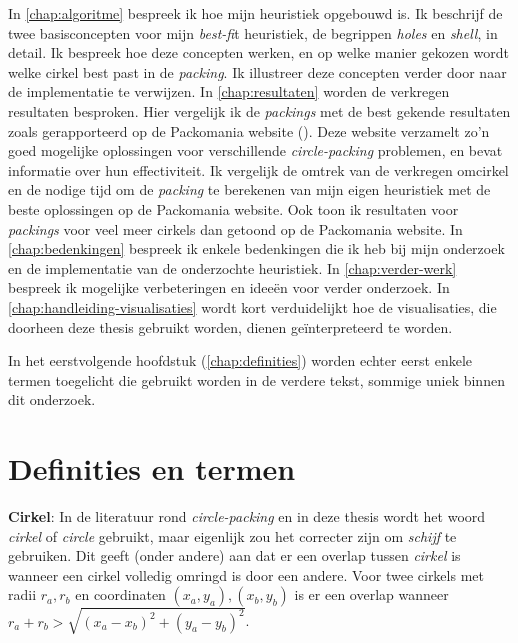 \documentclass[12pt,a4paper,oneside]{book}
\begin{document}
In \autoref{chap:algoritme} bespreek ik hoe mijn heuristiek opgebouwd is.
Ik beschrijf de twee basisconcepten voor mijn \textit{best-fi}t heuristiek, de begrippen \textit{holes} en \textit{shell}, in detail.
Ik bespreek hoe deze concepten werken, en op welke manier gekozen wordt welke cirkel best past in de \textit{packing}.
Ik illustreer deze concepten verder door naar de implementatie te verwijzen.
In \autoref{chap:resultaten} worden de verkregen resultaten besproken.
Hier vergelijk ik de \textit{packings} met de best gekende resultaten zoals gerapporteerd op de Packomania website (\cite{packomania}).
Deze website verzamelt zo'n goed mogelijke oplossingen voor verschillende \textit{circle-packing} problemen, en bevat informatie over hun effectiviteit.
Ik vergelijk de omtrek van de verkregen omcirkel en de nodige tijd om de \textit{packing} te berekenen van mijn eigen heuristiek met de beste oplossingen op de Packomania website.
Ook toon ik resultaten voor \textit{packings} voor veel meer cirkels dan getoond op de Packomania website.
In \autoref{chap:bedenkingen} bespreek ik enkele bedenkingen die ik heb bij mijn onderzoek en de implementatie van de onderzochte heuristiek.
In \autoref{chap:verder-werk} bespreek ik mogelijke verbeteringen en ideeën voor verder onderzoek.
In \autoref{chap:handleiding-visualisaties} wordt kort verduidelijkt hoe de visualisaties, die doorheen deze thesis gebruikt worden, dienen geïnterpreteerd te worden.

In het eerstvolgende hoofdstuk (\autoref{chap:definities}) worden echter eerst enkele termen toegelicht die gebruikt worden in de verdere tekst, sommige uniek binnen  dit onderzoek.


\chapter{Definities en termen} \label{chap:definities}

\textbf{Cirkel}: In de literatuur rond \textit{circle-packing} en in deze thesis wordt het woord \textit{cirkel} of \textit{circle} gebruikt, maar eigenlijk zou het correcter zijn om \textit{schijf} te gebruiken. Dit geeft (onder andere) aan dat er een overlap tussen \textit{cirkel} is wanneer een cirkel volledig omringd is door een andere.
Voor twee cirkels met radii $r_a, r_b$ en coordinaten  $(x_a,y_a), (x_b,y_b)$ is er een overlap wanneer $r_a + r_b > \sqrt{(x_a-x_b)^2 + (y_a-y_b)^2}$. 
\end{document}
